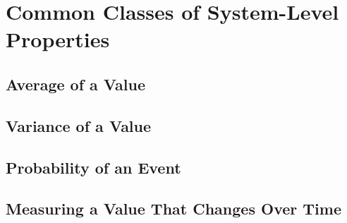 \section{Common Classes of System-Level Properties}


\subsection{Average of a Value}

\subsection{Variance of a Value}

\subsection{Probability of an Event}


\subsection{Measuring a Value That Changes Over Time}




